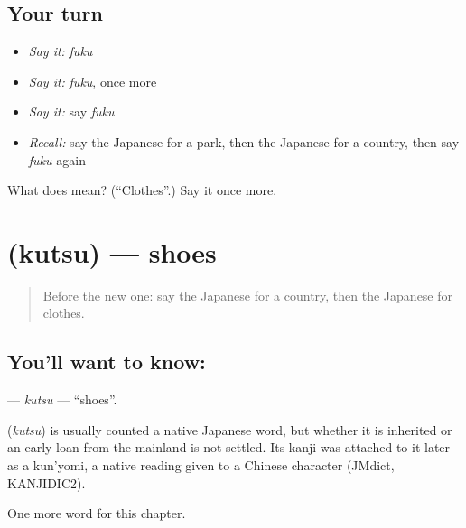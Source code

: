 \subsection*{Your turn}
\begin{itemize}
\raggedright
  \item \emph{Say it:} \emph{fuku}
  \item \emph{Say it:} \emph{fuku}, once more
  \item \emph{Say it:} say \emph{fuku}
  \item \emph{Recall:} say the Japanese for a park, then the Japanese for a country, then say \emph{fuku} again
\end{itemize}

\begin{tcolorbox}[breakable,colback=teal!4,colframe=teal!35!black,title={Before you move on}]
What does  mean? (\textquotedblleft{}Clothes\textquotedblright{}.) Say it once more.
\end{tcolorbox}
\section[\texorpdfstring{\ja{くつ} (kutsu)}{くつ (kutsu)}]{ (kutsu) — shoes}

\label{lesson:JA-C58-kutsu}



\begin{quote}
Before the new one: say the Japanese for a country, then the Japanese for clothes.
\end{quote}

\subsection*{You'll want to know: }
\textbf{} — \emph{kutsu} — \textquotedblleft{}shoes\textquotedblright{}.

\begin{cousinweb}
\textbf{} (\emph{kutsu}) is usually counted a native Japanese word, but whether it is inherited or an early loan from the mainland is not settled. Its kanji was attached to it later as a kun'yomi, a native reading given to a Chinese character (JMdict, KANJIDIC2).
\end{cousinweb}

\begin{grammarlens}[title={What you've built}]
One more word for this chapter.
\end{grammarlens}

